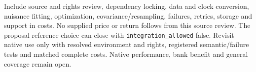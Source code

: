 Include source and rights review, dependency locking, data and clock conversion, nuisance fitting, optimization, covariance/resampling, failures, retries, storage and support in costs. No supplied price or return follows from this source review. The proposal reference choice can close with \texttt{integration\_allowed} false. Revisit native use only with resolved environment and rights, registered semantic/failure tests and matched complete costs. Native performance, bank benefit and general coverage remain open.~\citep{exec20_python_effect_source,exec24_statsmodels_distribution}
